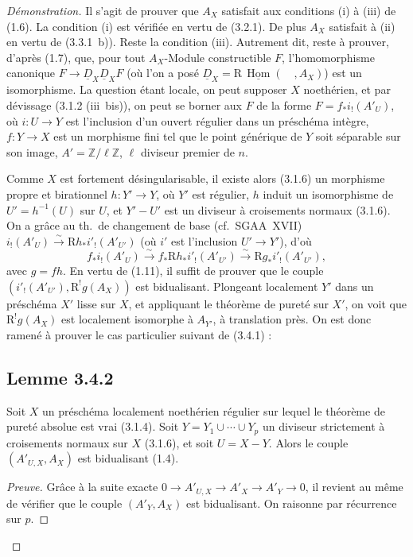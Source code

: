 \documentclass[11pt]{article}
\DeclareMathOperator{\Hom}{Hom}
\newcommand{\R}{\mathrm{R}}
\newcommand{\Z}{\mathbb{Z}}
\providecommand{\Hom}{\operatorname{Hom}}
\providecommand{\R}{\mathrm R}
\providecommand{\Z}{\mathbb Z}
\providecommand{\Hom}{\operatorname{Hom}}
\begin{document}
\begin{proof}[Démonstration]
Il s'agit de prouver que $A_X$ satisfait aux conditions (i) à (iii) de (1.6). La condition (i) est vérifiée en vertu de (3.2.1). De plus $A_X$ satisfait à (ii) en vertu de (3.3.1~b)). Reste la condition (iii). Autrement dit, reste à prouver, d'après (1.7), que, pour tout $A_X$-Module constructible $F$, l'homomorphisme canonique $F \to \underline{D}_X \underline{D}_X F$ (où l'on a posé $\underline{D}_X = \R\,\underline{\Hom}(\quad, A_X)$) est un isomorphisme. La question étant locale, on peut supposer $X$ noethérien, et par dévissage (3.1.2 (iii~bis)), on peut se borner aux $F$ de la forme $F = f_{*}i_{!}(A'_U)$, où $i : U \to Y$ est l'inclusion d'un ouvert régulier dans un préschéma intègre, $f : Y \to X$ est un morphisme fini tel que le point générique de $Y$ soit séparable sur son image, $A' = \Z/\ell\Z$, $\ell$ diviseur premier de $n$.

Comme $X$ est fortement désingularisable, il existe alors (3.1.6) un morphisme propre et birationnel $h : Y' \to Y$, où $Y'$ est régulier, $h$ induit un isomorphisme de $U' = h^{-1}(U)$ sur $U$, et $Y' - U'$ est un diviseur à croisements normaux (3.1.6). On a grâce au th.~de changement de base (cf.~SGAA~XVII) $i_{!}(A'_U) \xrightarrow{\sim} \R h_{*} i'_{!}(A'_{U'})$ (où $i'$ est l'inclusion $U' \to Y'$), d'où
\[
f_{*} i_{!}(A'_U) \xrightarrow{\sim} f_{*} \R h_{*} i'_{!}(A'_{U'}) \xrightarrow{\sim} \R g_{*} i'_{!}(A'_{U'}),
\]
avec $g = fh$. En vertu de (1.11), il suffit de prouver que le couple $(i'_{!}(A'_{U'}), \R^{!}g(A_X))$ est bidualisant. Plongeant localement $Y'$ dans un préschéma $X'$ lisse sur $X$, et appliquant le théorème de pureté sur $X'$, on voit que $\R^{!}g(A_X)$ est localement isomorphe à $A_{Y'}$, à translation près. On est donc ramené à prouver le cas particulier suivant de (3.4.1) :

\subsection*{Lemme 3.4.2}
Soit $X$ un préschéma localement noethérien régulier sur lequel le théorème de pureté absolue est vrai (3.1.4). Soit $Y = Y_1 \cup \cdots \cup Y_p$ un diviseur strictement à croisements normaux sur $X$ (3.1.6), et soit $U = X - Y$. Alors le couple $(A'_{U,X}, A_X)$ est bidualisant (1.4).

\begin{proof}[Preuve]
Grâce à la suite exacte $0 \to A'_{U,X} \to A'_X \to A'_Y \to 0$, il revient au même de vérifier que le couple $(A'_Y, A_X)$ est bidualisant. On raisonne par récurrence sur $p$.


\end{proof}
\end{proof}
\end{document}
